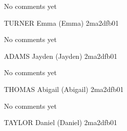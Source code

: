 \documentclass[11pt]{article}
\begin{document}
No comments yet

\newpage

TURNER Emma (Emma) \hfill 2ma2dfb01 \\

\noindent
\begin{minipage}[t]{0.49\textwidth}
\centering
{}
\end{minipage}
\hfill
\begin{minipage}[t]{0.49\textwidth}
\centering
{}
\end{minipage}

No comments yet

\newpage

ADAMS Jayden (Jayden) \hfill 2ma2dfb01 \\

\noindent
\begin{minipage}[t]{0.49\textwidth}
\centering
{}
\end{minipage}
\hfill
\begin{minipage}[t]{0.49\textwidth}
\centering
{}
\end{minipage}

No comments yet

\newpage

THOMAS Abigail (Abigail) \hfill 2ma2dfb01 \\

\noindent
\begin{minipage}[t]{0.49\textwidth}
\centering
{}
\end{minipage}
\hfill
\begin{minipage}[t]{0.49\textwidth}
\centering
{}
\end{minipage}

No comments yet

\newpage

TAYLOR Daniel (Daniel) \hfill 2ma2dfb01 \\

\noindent
\begin{minipage}[t]{0.49\textwidth}
\centering
{}
\end{minipage}
\hfill
\begin{minipage}[t]{0.49\textwidth}
\centering
{}
\end{minipage}
\end{document}
